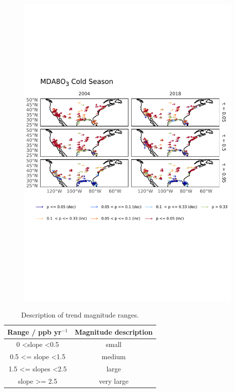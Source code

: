 \documentclass[journal abbreviation, manuscript]{copernicus}
\begin{document}
\begin{figure}[h!]
\centering
\includegraphics[height=\textheight]{figures/paper_figures/o3_map/o3_map_piecewise_stats_freeTau_mda8_anom_cold_us_o3.pdf}
\caption{}
\label{fig:o3_map_us_mda8_warm}
\end{figure}

\begin{table}[h]
\caption{Description of trend magnitude ranges.}
\begin{tabular}{c|c}
Range / ppb yr$^{-1}$                 & Magnitude description \\ \hline
0 \textless slope \textless 0.5       & small                 \\
0.5 \textless{}= slope \textless 1.5  & medium              \\
1.5 \textless{}= slopes \textless 2.5 & large                 \\
slope \textgreater{}= 2.5             & very large           
\end{tabular}
\label{tab:magnitude_description_table}
\end{table}
\end{document}
